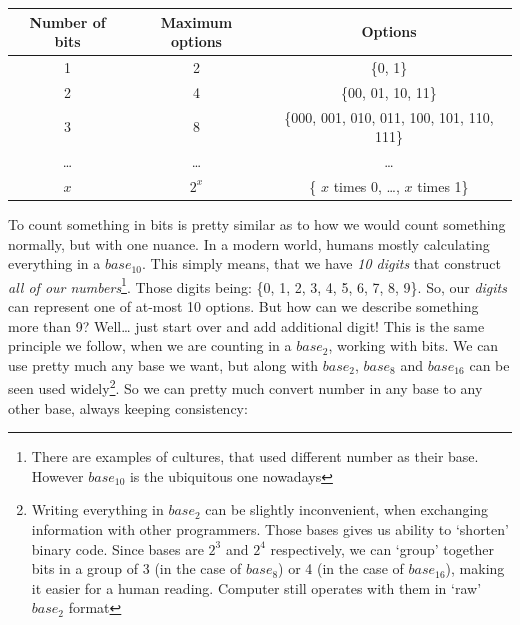 \documentclass{article}
\begin{document}
            \begin{center}
                \begin{longtable}{|c|c|c|}
                    \hline
                    Number of bits & Maximum options & Options \\\hline
                    1 & 2 & \{0, 1\} \\\hline
                    2 & 4 & \{00, 01, 10, 11\} \\\hline
                    3 & 8 & \{000, 001, 010, 011, 100, 101, 110, 111\} \\\hline
                    \ldots & \ldots & \ldots \\\hline
                    $x$ & $2^x$ & \{ $x$ times 0, \ldots, $x$ times 1\} \\\hline
                \end{longtable}
            \end{center}

            To count something in bits is pretty similar as to how we would count something normally, but with one nuance. In a modern world, humans mostly calculating 
            everything in a $base_{10}$. This simply means, that we have \emph{10 digits} that construct \emph{all of our numbers}\footnote{There are examples of cultures, that used different number as their base. However $base_{10}$ is the ubiquitous one nowadays}. 
            Those digits being: \{0, 1, 2, 3, 4, 5, 6, 7, 8, 9\}. So, our \emph{digits} can represent one of at-most 10 options. But how can we describe something more
            than 9? Well\ldots{} just start over and add additional digit! This is the same principle we follow, when we are counting in a $base_2$, working with bits.
            We can use pretty much any base we want, but along with $base_2$, $base_8$ and $base_{16}$ can be seen used widely\footnote{Writing everything in $base_2$
            can be slightly inconvenient, when exchanging information with other programmers. Those bases gives us ability to `shorten' binary code. Since bases
            are $2^3$ and $2^4$ respectively, we can `group' together bits in a group of 3 (in the case of $base_8$) or 4 (in the case of $base_{16}$), making it 
            easier for a human reading. Computer still operates with them in `raw' $base_2$ format}. So we can pretty much convert number in any base to any other 
            base, always keeping consistency:
\end{document}
